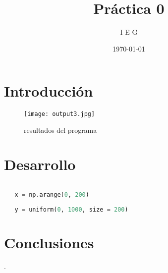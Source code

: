 \documentclass{article}
\author{I E G} %
\title{Práctica 0} %
\date{\today}
\begin{document}

\maketitle %

\begin{abstract} %

\end{abstract}

\section{Introducci\'{o}n}\label{intro} %






\begin{figure} %
    \centering
    \texttt{[image: output3.jpg]} %
    \caption{resultados del programa}
    \label{grafica}
\end{figure}

\section{Desarrollo}

 

\begin{lstlisting}[language = python]

   x = np.arange(0, 200)
   
   y = uniform(0, 1000, size = 200)
\end{lstlisting}

\section{Conclusiones}

.



\end{document}

